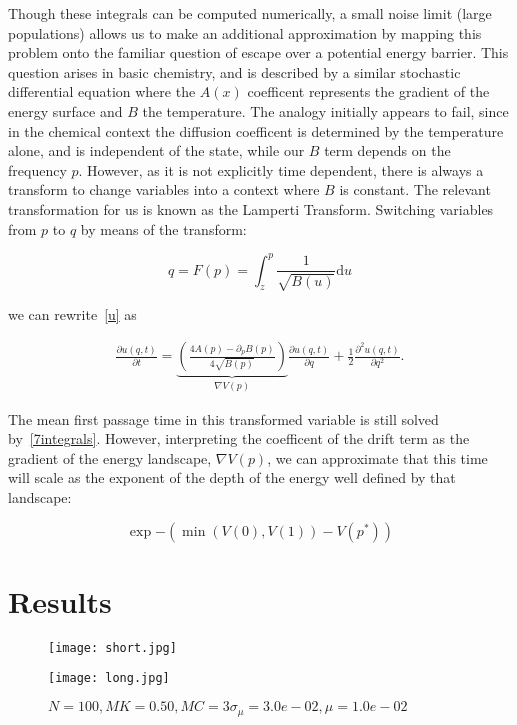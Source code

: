 \documentclass[authoryear,review,11pt]{elsarticle}
\newcommand{\ud}{\mathrm{d}}
\begin{document}
Though these integrals can be computed numerically, a small noise limit (large populations) allows us to make an additional approximation by mapping this problem onto the familiar question of escape over a potential energy barrier.  This question arises in basic chemistry, and is described by a similar stochastic differential equation where the $A(x)$ coefficent represents the gradient of the energy surface and $B$ the temperature.  The analogy initially appears to fail, since in the chemical context the diffusion coefficent is determined by the temperature alone, and is independent of the state, while our $B$ term depends on the frequency $p$.  However, as it is not explicitly time dependent, there is always a transform to change variables into a context where $B$ is constant.  The relevant transformation for us is known as the Lamperti Transform.  Switching variables from $p$ to $q$ by means of the transform:

\begin{equation}
q = F(p) = \int_z^{p} \frac{1}{\sqrt{B(u)}} \ud u
\label{p_to_q}
\end{equation}

we can rewrite~\eqref{u} as

\begin{align}
\frac{\partial u(q,t)}{\partial t} = \underbrace{\left(\frac{4 A(p)- \partial_p B(p) }{4\sqrt{B(p)}}  \right)}_{\nabla V(p)} \frac{\partial u(q,t)}{\partial q} + \frac{1}{2} \frac{\partial^2 u(q,t)}{\partial q^2}.
\label{new_u}
\end{align}

The mean first passage time in this transformed variable is still solved by~\eqref{7integrals}.  However, interpreting the coefficent of the drift term as the gradient of the energy landscape, $\nabla V(p)$, we can approximate that this time will scale as the exponent of the depth of the energy well defined by that landscape:

\begin{equation}
\exp{- (\min(V(0), V(1)) - V(p^*) )}
\end{equation}




\section{Results}
\begin{figure}
\begin{center}
\texttt{[image: short.jpg]}

\texttt{[image: long.jpg]}
\end{center}
\caption{$N = 100, MK = 0.50, MC= 3 \sigma_{\mu} = 3.0e-02, \mu = 1.0e-02$}
\label{fig:times}
\end{figure}


\end{document}

